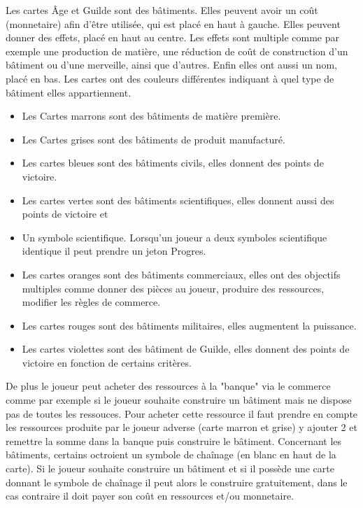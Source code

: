 \documentclass[a4paper, 12pt, french]{article}
\begin{document}
	Les cartes Âge et Guilde sont des bâtiments. Elles peuvent avoir un coût (monnetaire) afin d'être
	utilisée, qui est placé en haut à gauche. Elles peuvent donner des effets, placé en haut au centre.
	Les effets sont multiple comme par exemple une production de matière, une réduction de coût de construction
	d'un bâtiment ou d'une merveille, ainsi que d'autres. Enfin elles ont aussi un nom, placé en bas. Les cartes
	ont des couleurs différentes indiquant à quel type de bâtiment elles appartiennent.
	\begin{itemize}
		\item Les Cartes marrons sont des bâtiments de matière première.
		\item Les Cartes grises sont des bâtiments de produit manufacturé.
		\item Les cartes bleues sont des bâtiments civils, elles donnent des points de victoire.
		\item Les cartes vertes sont des bâtiments scientifiques, elles donnent aussi des points de victoire et
		\item Un symbole scientifique. Lorsqu'un joueur a deux symboles scientifique identique
		il peut prendre un jeton Progres.
		\item Les cartes oranges sont des bâtiments commerciaux, elles ont des objectifs multiples comme donner
		des pièces au joueur, produire des ressources, modifier les règles de commerce.
		\item Les cartes rouges sont des bâtiments militaires, elles augmentent la puissance.
		\item Les cartes violettes sont des bâtiment de Guilde, elles donnent des points de victoire en fonction
		de certains critères.
	\end{itemize}

	De plus le joueur peut acheter des ressources à la "banque" via le commerce comme par exemple si le joueur souhaite
	construire un bâtiment mais ne dispose pas de toutes les ressouces. Pour acheter cette ressource il faut prendre
	en compte les ressources produite par le joueur adverse (carte marron et grise) y ajouter 2 et remettre la somme
	dans la banque puis construire le bâtiment. Concernant les bâtiments, certains octroient un symbole de chaînage
	(en blanc en haut de la carte). Si le joueur souhaite construire un bâtiment et si il possède une carte
	donnant le symbole de chaînage il peut alors le construire gratuitement, dans le cas contraire
	il doit payer son coût en ressources et/ou monnetaire.
\end{document}
